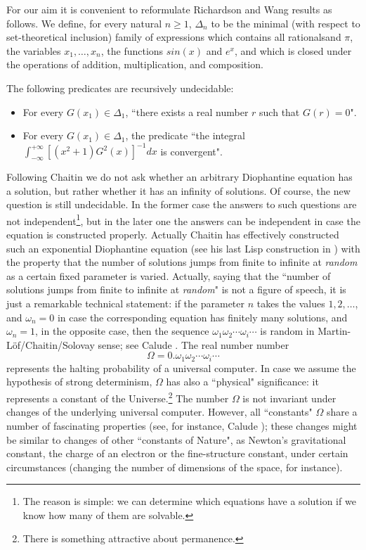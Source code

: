 For our aim it is convenient to reformulate Richardson \cite{richardson}
and Wang \cite{wang} results as follows.  We define, for every natural $n
\geq 1$, $\Delta_n$
to be
the minimal (with respect to
set-theoretical inclusion) family of expressions
 which contains
all rationalsand $\pi$,
the variables $x_1, \ldots ,x_n$,
the functions $sin(x)$ and $e^x$,
and which is closed under the operations of addition, multiplication, and
composition.

The following predicates are recursively undecidable:
\begin{itemize}
\item
For every $G(x_1) \in \Delta_1$, ``there exists a real number $r$ such that
$G(r) = 0$".
\item
For   every $G(x_1) \in \Delta_1$, the predicate ``the integral
 $\int_{- \infty}^{+\infty} [(x^2 + 1) G^{2}(x)]^{-1} dx$
is convergent".
\end{itemize}

Following Chaitin \cite{ch8,ch9} we do not ask whether an arbitrary
Diophantine equation has a solution, but rather whether it has an infinity of
solutions. Of course, the new question is still undecidable. In the former
case  the answers to such questions are  not independent\footnote{The
reason is simple:
we can determine which equations have a solution if we know how many of
them are solvable.},
but in the later one the answers can be independent in case the equation is
constructed
properly. Actually Chaitin has effectively constructed such an exponential
Diophantine equation (see his last Lisp construction in \cite{ch10})
with the property that the number of solutions jumps from finite to
infinite at {\it
random} as a certain fixed parameter is varied. Actually, saying that the
``number of solutions jumps from finite to infinite at {\it
random}" is not a figure of speech, it is just a remarkable technical statement:
if  the parameter $n$ takes the values $ 1,2, \ldots$, and $\omega_n = 0$
in case the corresponding
equation has finitely many solutions, and $\omega_n= 1$, in the opposite
case, then
the sequence $\omega_1\omega_2 \cdots \omega_i \cdots$ is random in
Martin-L\" of/Chaitin/Solovay
sense; see Calude \cite{cris}.
 The real number number
\[\Omega = 0.\omega_1\omega_2 \cdots \omega_i \cdots\]
represents the halting probability of a universal  computer. In case we
assume the
hypothesis of strong determinism, $\Omega$ has also a ``physical"
significance: it represents
a constant of the Universe.\footnote{There is something attractive
about permanence.} The number $\Omega$ is not invariant under changes of
the underlying universal  computer.
However, all ``constants" $\Omega$ share a number of fascinating properties
(see, for instance,
Calude \cite{cris}); these changes  might be similar to changes
of other ``constants of Nature", as Newton's gravitational constant, the
charge of an electron or the
fine-structure constant, under certain circumstances (changing the number
of dimensions of the space, for instance).



